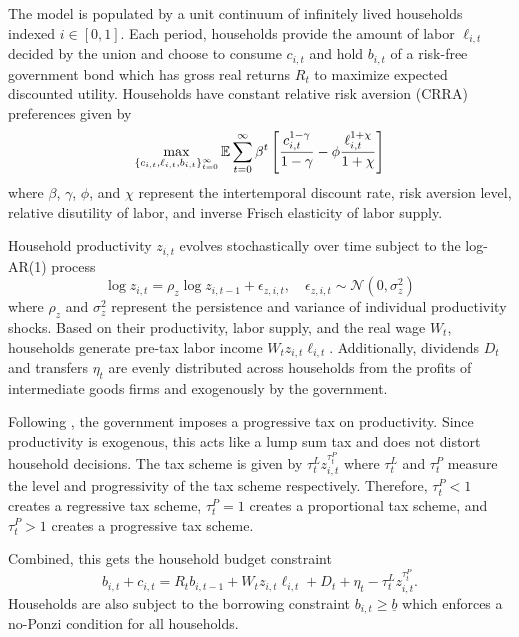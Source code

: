 The model is populated by a unit continuum of infinitely lived households indexed $i \in [0, 1]$. Each period, households provide the amount of labor $\ell_{i, t}$ decided by the union and choose to consume $c_{i, t}$ and hold $b_{i, t}$ of a risk-free government bond which has gross real returns $R_t$ to maximize expected discounted utility. Households have constant relative risk aversion (CRRA) preferences given by 
\begin{equation*}
    \max_{\{c_{i,t}, \ell_{i, t}, b_{i, t}\}_{t=0}^\infty} \mathbb{E} \sum_{t = 0}^\infty \beta^t \left[ \frac{c_{i, t}^{1 - \gamma}}{1 - \gamma} - \phi \frac{\ell_{i, t}^{1 + \chi}}{1 + \chi} \right]
\end{equation*}
where $\beta$, $\gamma$, $\phi$, and $\chi$ represent the intertemporal discount rate, risk aversion level, relative disutility of labor, and inverse Frisch elasticity of labor supply.

Household productivity $z_{i, t}$ evolves stochastically over time subject to the log-AR(1) process
\begin{equation*}
    \log z_{i, t} = \rho_z \log z_{i, t-1} + \epsilon_{z, i, t}, \quad \epsilon_{z, i, t} \sim \mathcal{N} (0, \sigma_z^2) \label{eq:idio_prod}
\end{equation*}
where $\rho_z$ and $\sigma_z^2$ represent the persistence and variance of individual productivity shocks. Based on their productivity, labor supply, and the real wage $W_t$, households generate pre-tax labor income $W_t z_{i, t} \ell_{i, t}$. Additionally, dividends $D_t$ and transfers $\eta_t$ are evenly distributed across households from the profits of intermediate goods firms and exogenously by the government.

Following \textcite{mckay2016power}, the government imposes a progressive tax on productivity. Since productivity is exogenous, this acts like a lump sum tax and does not distort household decisions. The tax scheme is given by $\tau_t^L z_{i, t}^{\tau_t^P}$ where $\tau_t^L$ and $\tau_t^P$ measure the level and progressivity of the tax scheme respectively. Therefore, $\tau_t^P < 1$ creates a regressive tax scheme, $\tau_t^P = 1$ creates a proportional tax scheme, and $\tau_t^P > 1$ creates a progressive tax scheme.

Combined, this gets the household budget constraint
\begin{equation*}
    b_{i, t} + c_{i, t} = R_t b_{i, t-1} + W_t z_{i, t} \ell_{i, t} + D_t + \eta_t - \tau_t^L z_{i, t}^{\tau_t^P}.
\end{equation*}
Households are also subject to the borrowing constraint $b_{i, t} \geq \underline{b}$ which enforces a no-Ponzi condition for all households.


